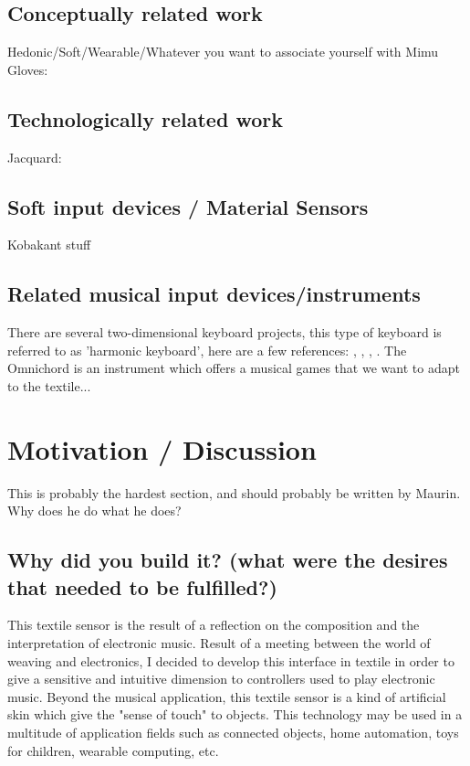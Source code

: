 \documentclass{sigchi-ext}
\begin{document}
\subsection{Conceptually related work}
Hedonic/Soft/Wearable/Whatever you want to associate yourself with
Mimu Gloves: \cite{mimu}


\subsection{Technologically related work}
Jacquard: \cite{jacquard}


\subsection{Soft input devices / Material Sensors}
Kobakant stuff


\subsection{Related musical input devices/instruments}
There are several two-dimensional keyboard projects, this type of keyboard is referred to as 'harmonic keyboard', here are a few references: \cite{lambdoma}, \cite{seaboard}, \cite{linnstrument}, \cite{omnichord}.
The Omnichord is an instrument which offers a musical games that we want to adapt to the textile...


\section{Motivation / Discussion}

This is probably the hardest section, and should probably be written by Maurin. Why does he do what he does?


\subsection{Why did you build it? (what were the desires that needed to be fulfilled?)}
This textile sensor is the result of a reflection on the composition and the interpretation of electronic music. Result of a meeting between the world of weaving and electronics, I decided to develop this interface in textile in order to give a sensitive and intuitive dimension to controllers used to play electronic music.
Beyond the musical application, this textile sensor is a kind of artificial skin which give the "sense of touch" to objects. This technology may be used in a multitude of application fields such as connected objects, home automation, toys for children, wearable computing, etc.
\end{document}
